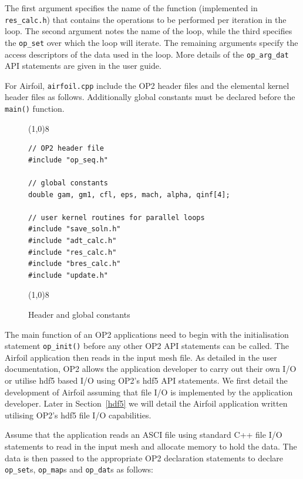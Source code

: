 \documentclass[11pt]{article}
\begin{document}
\noindent The first argument specifies the name of the function (implemented in \texttt{res\_calc.h}) that contains the
operations to be performed per iteration in the loop. The second argument notes the name of the loop, while the third
specifies the \texttt{op\_set} over which the loop will iterate. The remaining arguments specify the access descriptors
of the data used in the loop. More details of the \texttt{op\_arg\_dat} API statements are given in the user guide.

For Airfoil, \texttt{airfoil.cpp} include the OP2 header files and the elemental kernel header files as follows.
Additionally global constants must be declared before the \texttt{main()} function.

\begin{figure}[!h]\small
\vspace{-0pt}\noindent\line(1,0){8}\vspace{-10pt}
\begin{lstlisting}
// OP2 header file
#include "op_seq.h"

// global constants
double gam, gm1, cfl, eps, mach, alpha, qinf[4];

// user kernel routines for parallel loops
#include "save_soln.h"
#include "adt_calc.h"
#include "res_calc.h"
#include "bres_calc.h"
#include "update.h"
\end{lstlisting}\vspace{-10pt}
\vspace{-0pt}\noindent\line(1,0){8}\vspace{-10pt}
\caption{\small Header and global constants }
\normalsize\vspace{-10pt}\label{fig:header}
\end{figure}

\noindent The main function of an OP2 applications need to begin with the initialisation statement \texttt{op\_init()}
before any other OP2 API statements can be called. The Airfoil application then reads in the input mesh file. As
detailed in the user documentation, OP2 allows the application developer to carry out their own I/O or utilise hdf5
based I/O using OP2's hdf5 API statements. We first detail the development of Airfoil assuming that file I/O is
implemented by the application developer. Later in Section~\ref{hdf5} we will detail the Airfoil application written
utilising OP2's hdf5 file I/O capabilities. 

Assume that the application reads an ASCI file using standard C++ file I/O statements to read in the input mesh and
allocate memory to hold the data. The data is then passed to the appropriate OP2 declaration statements to declare
\texttt{op\_set}s, \texttt{op\_map}s and \texttt{op\_dat}s as follows:
\end{document}
